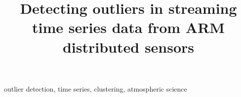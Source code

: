 \documentclass[conference]{IEEEtran}
\begin{document}
\title{Detecting outliers in streaming time series data from ARM distributed sensors
}
\maketitle



\begin{IEEEkeywords}
outlier detection, time series, clustering, atmospheric science
\end{IEEEkeywords}










\end{document}
